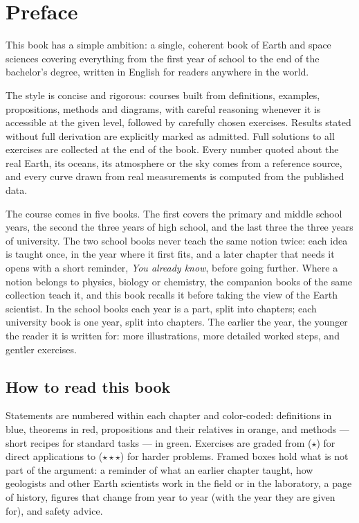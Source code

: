 \chapter{Preface}

This book has a simple ambition: a single, coherent book of Earth and space
sciences covering everything from the first year of school to the end of
the bachelor's degree, written in English for readers anywhere in the
world.

The style is concise and rigorous: courses built from definitions, examples,
propositions, methods and diagrams, with careful reasoning whenever it is
accessible at the given level, followed by carefully chosen exercises.
Results stated without full derivation are explicitly marked as admitted.
Full solutions to all exercises are collected at the end of the book.
Every number quoted about the real Earth, its oceans, its atmosphere or
the sky comes from a reference source, and every curve drawn from real
measurements is computed from the published data.

The course comes in five books. The first covers the primary and middle
school years, the second the three years of high school, and the last
three the three years of university. The two school books never teach the
same notion twice: each idea is taught once, in the year where it first
fits, and a later chapter that needs it opens with a short reminder,
\emph{You already know}, before going further. Where a notion belongs to
physics, biology or chemistry, the companion books of the same collection
teach it, and this book recalls it before taking the view of the Earth
scientist. In the school books each year is a part, split into chapters;
each university book is one year, split into chapters. The earlier the
year, the younger the reader it is written for: more illustrations, more
detailed worked steps, and gentler exercises.

\section*{How to read this book}

Statements are numbered within each chapter and color-coded: definitions in
blue, theorems in red, propositions and their relatives in orange, and
methods --- short recipes for standard tasks --- in green. Exercises are
graded from ($\star$) for direct applications to ($\star\star\star$) for
harder problems. Framed boxes hold what is not part of the argument: a
reminder of what an earlier chapter taught, how geologists and other Earth
scientists work in the field or in the laboratory, a page of history,
figures that change from year to year (with the year they are given for),
and safety advice.


